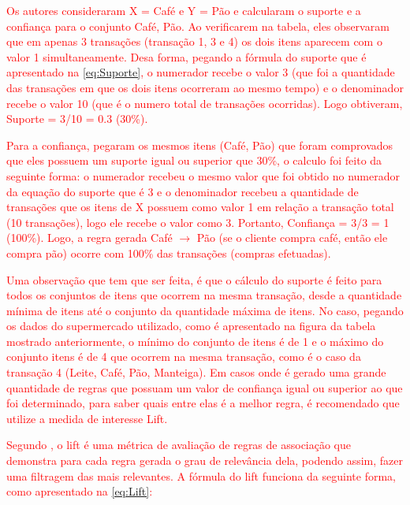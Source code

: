 \textcolor{red}{Os autores  consideraram X = {Café} e Y = {Pão} e calcularam o suporte e a confiança para o conjunto {Café, Pão}. Ao verificarem na tabela, eles observaram que em apenas 3 transações (transação 1, 3 e 4) os dois itens aparecem com o valor 1 simultaneamente. Desa forma, pegando a fórmula do suporte que é apresentado na \autoref{eq:Suporte}, o numerador recebe o valor 3 (que foi a quantidade das transações em que os dois itens ocorreram ao mesmo tempo) e o denominador recebe o valor 10 (que é o numero total de transações ocorridas). Logo obtiveram, Suporte = 3/10 = 0.3 (30\%).}

\par
\textcolor{red}{Para a confiança,  pegaram os mesmos itens (Café, Pão) que foram comprovados que eles possuem um suporte igual ou superior que 30\%, o calculo foi feito da seguinte forma: o numerador recebeu o mesmo valor que foi obtido no numerador da equação do suporte que é 3 e o denominador recebeu a quantidade de transações que os itens de X possuem como valor 1 em relação a transação total (10 transações), logo ele recebe o valor como 3. Portanto, Confiança = 3/3 = 1 (100\%). Logo, a regra gerada Café $\rightarrow$ Pão (se o cliente compra café, então ele compra pão) ocorre com 100\% das transações (compras efetuadas).}

\par
\textcolor{red}{Uma observação que tem que ser feita, é que o cálculo do suporte é feito para todos os conjuntos de itens que ocorrem na mesma transação, desde a quantidade mínima de itens até o conjunto da quantidade máxima de itens. No caso, pegando os dados do supermercado utilizado, como é apresentado na figura da tabela mostrado anteriormente, o mínimo do conjunto de itens é de 1 e o máximo do conjunto itens é de 4 que ocorrem na mesma transação, como é o caso da transação 4 (Leite, Café, Pão, Manteiga). Em casos onde é gerado uma grande quantidade de regras que possuam um valor de confiança igual ou superior ao que foi determinado, para saber quais entre elas é a melhor regra, é recomendado que utilize a medida de interesse Lift.}

\par
\textcolor{red}{Segundo , o lift é uma métrica de avaliação de regras de associação que demonstra para cada regra gerada o grau de relevância dela, podendo assim, fazer uma filtragem das mais relevantes. A fórmula do lift funciona da seguinte forma, como apresentado na \autoref{eq:Lift}:}

